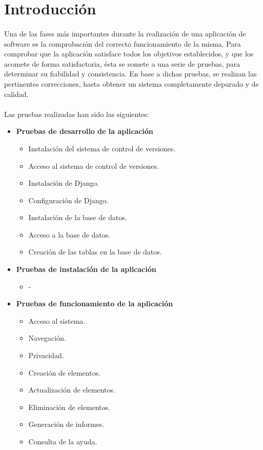 \section{Introducción}

  \paragraph{}Una de las fases más importantes durante la realización de una
  aplicación de software es la comprobación del correcto funcionamiento de la
  misma. Para comprobar que la aplicación satisface todos los objetivos
  establecidos, y que los acomete de forma satisfactoria, ésta se somete a una
  serie de pruebas, para determinar su fiabilidad y consistencia. En base a
  dichas pruebas, se realizan las pertinentes correcciones, hasta obtener un
  sistema completamente depurado y de calidad.

 \paragraph{}Las pruebas realizadas han sido las siguientes:

 \begin{itemize}

  \item \textbf{Pruebas de desarrollo de la aplicación}
  \begin{itemize}
   \item Instalación del sistema de control de versiones.
   \item Acceso al sistema de control de versiones.
   \item Instalación de Django.
   \item Configuración de Django.
   \item Instalación de la base de datos.
   \item Acceso a la base de datos.
   \item Creación de las tablas en la base de datos.
  \end{itemize}

  \item \textbf{Pruebas de instalación de la aplicación}
  \begin{itemize}
   \item -
  \end{itemize}

  \item \textbf{Pruebas de funcionamiento de la aplicación}
  \begin{itemize}
   \item Acceso al sistema.
   \item Navegación.
   \item Privacidad.
   \item Creación de elementos.
   \item Actualización de elementos.
   \item Eliminación de elementos.
   \item Generación de informes.
   \item Consulta de la ayuda.
  \end{itemize}

 \end{itemize}
